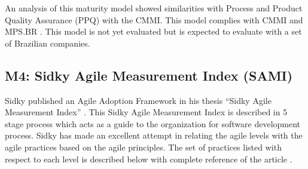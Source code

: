 \documentclass[a4paper,oneside]{bth}
\begin{document}
An analysis of this maturity model showed similarities with Process and Product Quality Assurance (PPQ) with the CMMI. This model complies with CMMI and MPS.BR \cite{selleri_silva_reference_2014}. This model is not yet evaluated but is expected to evaluate with a set of Brazilian companies.
\subsection{M4: Sidky Agile Measurement Index (SAMI)}
Sidky published an Agile Adoption Framework in his thesis “Sidky Agile Measurement Index” \cite{sidky_structured_2007}. This Sidky Agile Measurement Index is described in 5 stage process which acts as a guide to the organization for software development process. Sidky has made an excellent attempt in relating the agile levels with the agile practices based on the agile principles. The set of practices listed with respect to each level is described below with complete reference of the article \cite{sidky_structured_2007}.
\end{document}

